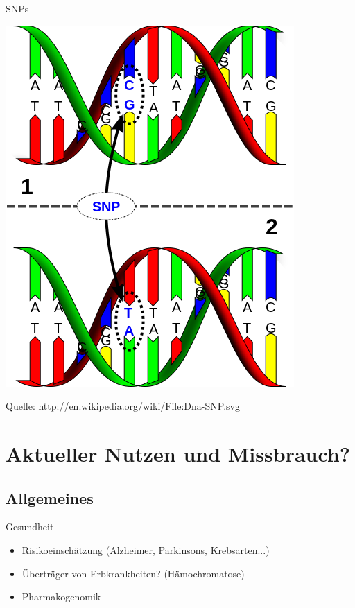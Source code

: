 \documentclass[12pt,a4paper]{beamer}
\begin{document}
\begin{frame}{SNPs}
	\begin{center}
		\includegraphics[scale=0.4]{SNP.png}\\
		\begin{tiny}Quelle: http://en.wikipedia.org/wiki/File:Dna-SNP.svg\end{tiny}
	\end{center}
\end{frame}
\section{Aktueller Nutzen und Missbrauch?}

\subsection{Allgemeines}

\begin{frame}{Gesundheit}
	\begin{itemize}
		\item Risikoeinsch\"atzung (Alzheimer, Parkinsons, Krebsarten...)
		\pause \item \"Ubertr\"ager von Erbkrankheiten? (H\"amochromatose)
		\pause \item Pharmakogenomik 
	\end{itemize}
\end{frame}
\end{document}

